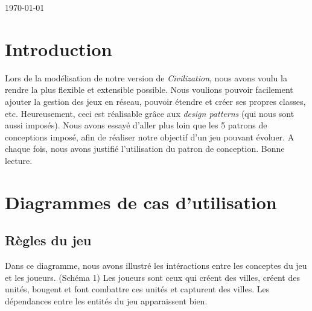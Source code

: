 \begin{titlepage}

{\large \today}\\[3cm] %


 

\vfill %

\end{titlepage}


\tableofcontents
{}
\newpage

\section{Introduction}

	Lors de la modélisation de notre version de \textit{Civilization}, nous avons voulu la rendre la plus flexible et extensible possible.
Nous voulions pouvoir facilement ajouter la gestion des jeux en réseau, pouvoir étendre et créer ses propres classes, etc.
Heureusement, ceci est réalisable grâce aux \textit{design patterns} (qui nous sont aussi imposés).
Nous avons essayé d'aller plus loin que les 5 patrons de conceptions imposé, afin de réaliser notre objectif d'un jeu pouvant évoluer.
A chaque fois, nous avons justifié l'utilisation du patron de conception.
	Bonne lecture.

\newpage

\section{Diagrammes de cas d'utilisation}
	\subsection{Règles du jeu}
		Dans ce diagramme, nous avons illustré les intéractions entre les conceptes du jeu et les joueurs. (Schéma 1)
	Les joueurs sont ceux qui créent des villes, créent des unités, bougent et font combattre ces unités et capturent des villes.
	Les dépendances entre les entités du jeu apparaissent bien.
	
